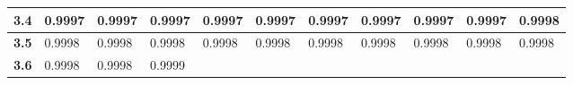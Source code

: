 \begin{longtable}{|l|l|l|l|l|l|l|l|l|l|l|}
    \textbf{3.4}  & 0.9997  & 0.9997  & 0.9997  & 0.9997  & 0.9997  & 0.9997  & 0.9997  & 0.9997  & 0.9997  & 0.9998\\ \hline
    
    \textbf{3.5}  & 0.9998  & 0.9998  & 0.9998  & 0.9998  & 0.9998  & 0.9998  & 0.9998  & 0.9998  & 0.9998  & 0.9998\\ \hline
    
    \textbf{3.6}  & 0.9998  & 0.9998  & 0.9999 &         &           &       &           &       &           &       \\ \hline
\end{longtable}
\renewcommand{\arraystretch}{1}


\changefontsizes{11pt}










